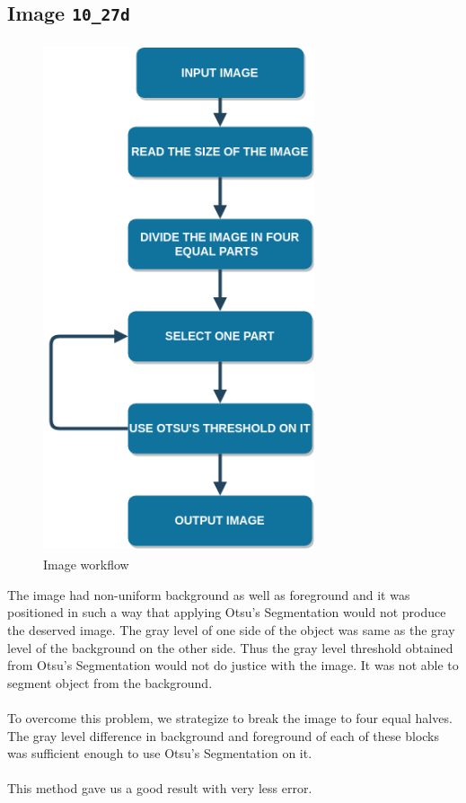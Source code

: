 \subsection{Image \texttt{10\_27d}}
\begin{figure}[h!]
  \centering
  \includegraphics[width=8cm,height=15cm,keepaspectratio]{img/10_27d_flow.png}
  \caption{Image  workflow}
\end{figure}

The image had non-uniform background as well as foreground and it was positioned in such a way that applying Otsu’s Segmentation would not produce the deserved image. The gray level of one side of the object was same as the gray level of the background on the other side. Thus the gray level threshold obtained from Otsu’s Segmentation would not do justice with the image. It was not able to segment object from the background.
\\
\\
To overcome this problem, we strategize to break the image to four equal halves. The gray level difference in background and foreground of each of these blocks was sufficient enough to use Otsu’s Segmentation on it.
\\
\\
This method gave us a good result with very less error.

